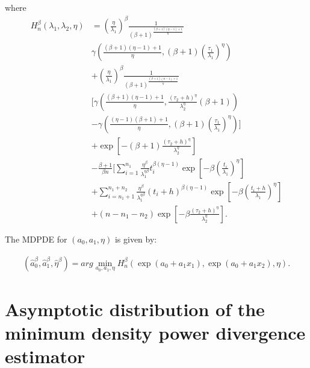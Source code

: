 \documentclass{article}
\begin{document}
where
\begin{equation}
\begin{aligned}
H_{n}^{\beta}(\lambda_1,\lambda_2,\eta)
&=\left(\frac{\eta}{\lambda_1}\right)^{\beta}
\frac{1}{(\beta+1)^{\frac{(\beta+1)(\eta-1)+1}{\eta}}}\\
&\gamma\!\left(
\frac{(\beta+1)(\eta-1)+1}{\eta},
(\beta+1)\left(\frac{\tau_1}{\lambda_1}\right)^{\eta}
\right)
\\
&+\left(\frac{\eta}{\lambda_1}\right)^{\beta}
\frac{1}{(\beta+1)^{\frac{(\beta+1)(\eta-1)+1}{\eta}}}
\\
&\Bigg[
\gamma\!\left(
\frac{(\beta+1)(\eta-1)+1}{\eta},
\frac{\left(\tau_2+h\right)^{\eta}}{\lambda_2^{\eta}}
(\beta+1)
\right)
\\
&
-\gamma\!\left(
\frac{(\eta-1)(\beta+1)+1}{\eta},
(\beta+1)\left(\frac{\tau_1}{\lambda_1}\right)^{\eta}
\right)
\Bigg]
\\
&+\exp\!\left[
-(\beta+1)\frac{\left(\tau_2+h\right)^{\eta}}{\lambda_2^{\eta}}
\right]
\\
&-\frac{\beta+1}{\beta n}
\Bigg[
\sum_{i=1}^{n_1}
\frac{\eta^{\beta}}{\lambda_1^{\eta\beta}}
t_i^{\beta(\eta-1)}
\exp\!\left[-\beta\left(\frac{t_i}{\lambda_1}\right)^{\eta}\right]
\\
&
+\sum_{i=n_1+1}^{n_1+n_2}
\frac{\eta^{\beta}}{\lambda_1^{\eta\beta}}
(t_i+h)^{\beta(\eta-1)}
\exp\!\left[-\beta\left(\frac{t_i+h}{\lambda_1}\right)^{\eta}\right]
\\
&
+(n-n_1-n_2)
\exp\!\left[
-\beta\frac{\left(\tau_2+h\right)^{\eta}}{\lambda_2^\eta}
\right].   \nonumber
\end{aligned}
\end{equation}

The MDPDE for $(a_0,a_1,\eta)$ is given by:

\begin{align*}
\left(\hat{a}_0^{\beta},\hat{a}_1^{\beta},\hat{\eta}^{\beta}\right)=arg \min_{a_0,a_1,\eta}H_{n}^{\beta}\left(\exp\left(a_0+a_1x_1\right),\exp\left(a_0+a_1x_2\right),\eta\right).
\end{align*}
\section{Asymptotic distribution of the minimum density power divergence estimator \label{sec:asymptotic}}
\end{document}
